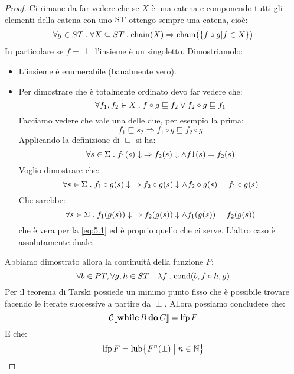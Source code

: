 \begin{proof}
Ci rimane da far vedere che se $X$ è una catena e
componendo tutti gli elementi della catena con uno $\mathrm{ST}$
ottengo sempre una catena, cioè:
\[ 
  \forall g \in ST \mathrel{.} \forall X \subseteq ST 
  \mathrel{.} \mathop{\mathrm{chain}}\nolimits(X) \Rightarrow \mathop{\mathrm{chain}}\nolimits\bigl(\{ f \circ g | f \in X \} \bigr)
\]
In particolare se $f = \perp$ l'insieme è un singoletto.
Dimostriamolo:
\begin{itemize}
  \item L'insieme è enumerabile (banalmente vero).
  \item Per dimostrare che è totalmente ordinato devo far vedere che:
  \[ 
    \forall f_1 , f_2 \in X \mathrel{.} f \circ g \sqsubseteq f_2 \lor f_2
    \circ g \sqsubseteq f_1
  \]
  Facciamo vedere che vale una delle due, per esempio la prima:
  \[ f_1 \sqsubseteq s_2 \Rightarrow f_1 \circ g \sqsubseteq f_2 \circ g \]
  Applicando la definizione di $ \sqsubseteq $ si ha:
  \begin{equation}
    \forall s \in \Sigma \mathrel{.} f_{1}(s) \downarrow \; \Rightarrow f_{2}(s) \downarrow
    \land f{1}(s)=f_{2}(s)
    \label{eq:5.1}
  \end{equation}
   Voglio dimostrare che:
   \[ 
     \forall s \in \Sigma \mathrel{.} f_1 \circ g(s) \downarrow
     \; \Rightarrow f_2 \circ g(s) \downarrow \land f_2
     \circ g(s) = f_1 \circ g(s)
    \]
    Che sarebbe:
    \[ 
      \forall s \in \Sigma \mathrel{.} f_{1}(g(s)) \downarrow
      \; \Rightarrow f_{2}(g(s)) \downarrow \land f_{1}(g(s))
      = f_{2}(g(s)) 
    \]
    che è vera per la \ref{eq:5.1} ed è proprio quello che ci serve.
    L'altro caso è assolutamente duale.
\end{itemize}
Abbiamo dimostrato allora la continuità della funzione $F$:
\[
  \forall b \in PT, \forall g,h \in ST \quad \lambda f \mathrel{.} \mathrm{cond}(b,f \circ h,g)
\]
Per il teorema di Tarski possiede un minimo
punto fisso che è possibile trovare facendo le iterate
successive a partire da $\perp$.
Allora possiamo concludere che:
\[ \mathcal{C} \llbracket \mathop{\textup{\textbf{while}}} B \mathop{\textup{\textbf{do}}} C \rrbracket = \mathop{\mathrm{lfp}}\nolimits F \]
E che:
\[ \mathop{\mathrm{lfp}}\nolimits F = \mathop{\mathrm{lub}}\nolimits \bigl\{ F^n(\perp ) \bigm| n \in \mathbb{N} \bigr\} \]
\end{proof}
